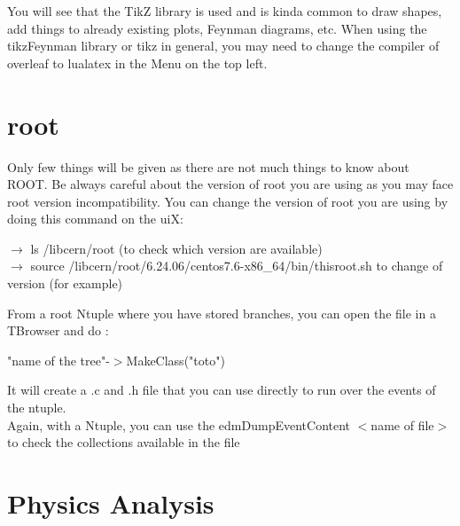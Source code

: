 \documentclass[reprint, a4paper, nofootinbib, amsmath, amssymb, aps]{revtex4-1}
\begin{document}
    You will see that the TikZ library is used and is kinda common to draw shapes, add things to already existing plots, Feynman diagrams, etc. When using the tikzFeynman library or tikz in general, you may need to change the compiler of overleaf to lualatex in the Menu on the top left.
    
\section{root}

 Only few things will be given as there are not much things to know  about ROOT.
 Be always careful about the version of root you are using as you may face root version incompatibility. You can change the version of root you are using by doing this command  on the uiX: \\
 \begin{center}
     $\rightarrow$ ls  /libcern/root (to check which version are available) \\
     $\rightarrow$ source /libcern/root/6.24.06/centos7.6-x86\_64/bin/thisroot.sh to change of version (for example)
 \end{center}

    From a root Ntuple where you have stored branches, you can open the file in a TBrowser and do :
    \begin{center}
        "name of the tree"-$>$MakeClass("toto")
    \end{center}
  It will create a .c and .h file that you can use directly to run over the events of the ntuple.\\
  Again, with a Ntuple, you can use the edmDumpEventContent $<$name of file$>$ to check the collections available in the file
  
  
\section{Physics Analysis}
\end{document}
